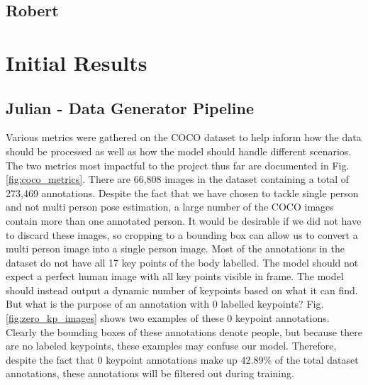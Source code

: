\documentclass[11pt, letterpaper]{article}
\begin{document}
\subsection{Robert}

\section{Initial Results}
\label{SectionInitialResults}

\subsection{Julian - Data Generator Pipeline}

Various metrics were gathered on the COCO dataset to help inform how the data should be processed as well as how the model should handle different scenarios. The two metrics most impactful to the project thus far are documented in Fig. \ref{fig:coco_metrics}. There are 66,808 images in the dataset containing a total of 273,469 annotations. Despite the fact that we have chosen to tackle single person and not multi person pose estimation, a large number of the COCO images contain more than one annotated person. It would be desirable if we did not have to discard these images, so cropping to a bounding box can allow us to convert a multi person image into a single person image. Most of the annotations in the dataset do not have all 17 key points of the body labelled. The model should not expect a perfect human image with all key points visible in frame. The model should instead output a dynamic number of keypoints based on what it can find. But what is the purpose of an annotation with 0 labelled keypoints? Fig. \ref{fig:zero_kp_images} shows two examples of these 0 keypoint annotations. Clearly the bounding boxes of these annotations denote people, but because there are no labeled keypoints, these examples may confuse our model. Therefore, despite the fact that 0 keypoint annotations make up 42.89\% of the total dataset annotations, these annotations will be filtered out during training.
\end{document}
